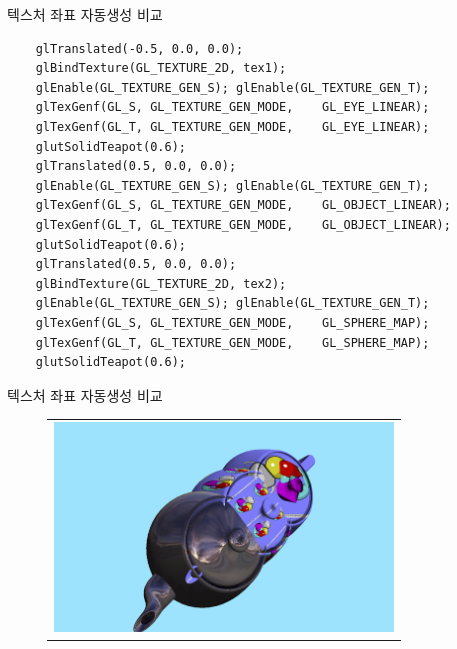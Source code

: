 \documentclass{beamer}
\begin{document}
\begin{frame}[fragile]{텍스처 좌표 자동생성 비교}

\lstset{language=C++} 
\begin{lstlisting}
	glTranslated(-0.5, 0.0, 0.0);
	glBindTexture(GL_TEXTURE_2D, tex1);
	glEnable(GL_TEXTURE_GEN_S); glEnable(GL_TEXTURE_GEN_T);
	glTexGenf(GL_S, GL_TEXTURE_GEN_MODE, 	GL_EYE_LINEAR);
	glTexGenf(GL_T, GL_TEXTURE_GEN_MODE, 	GL_EYE_LINEAR);
	glutSolidTeapot(0.6);
	glTranslated(0.5, 0.0, 0.0);
	glEnable(GL_TEXTURE_GEN_S); glEnable(GL_TEXTURE_GEN_T);
	glTexGenf(GL_S, GL_TEXTURE_GEN_MODE, 	GL_OBJECT_LINEAR);
	glTexGenf(GL_T, GL_TEXTURE_GEN_MODE,	GL_OBJECT_LINEAR);
	glutSolidTeapot(0.6);
	glTranslated(0.5, 0.0, 0.0);
	glBindTexture(GL_TEXTURE_2D, tex2);
	glEnable(GL_TEXTURE_GEN_S); glEnable(GL_TEXTURE_GEN_T);
	glTexGenf(GL_S, GL_TEXTURE_GEN_MODE,	GL_SPHERE_MAP);
	glTexGenf(GL_T, GL_TEXTURE_GEN_MODE, 	GL_SPHERE_MAP);
	glutSolidTeapot(0.6);
\end{lstlisting}

\end{frame}

\begin{frame}[fragile]{텍스처 좌표 자동생성 비교}

\begin{figure}[h!]
  \centering
	\begin{tabular}{c}
	\includegraphics[width=9cm]{OGL_texture/mappingComparison2.png} 
	\end{tabular}
\end{figure}

\end{frame}
\end{document}
